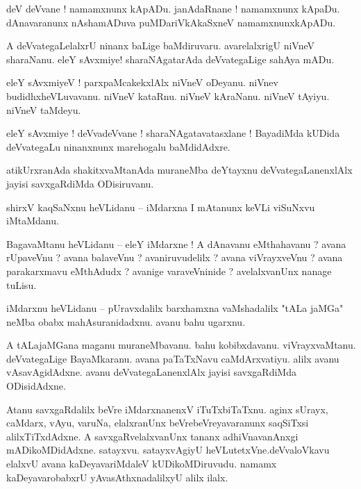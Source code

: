 \documentclass{article}
\begin{document}
\begin{mn}%
deV deVvane ! namamxnunx kApADu. janAdaRnane ! namamxnunx kApaDu. dAnavaranunx nAshamADuva 
puMDariVkAkaSxneV namamxnunxkApADu.
\end{mn}

\begin{mn}%
A deVvategaLelalxrU ninanx baLige baMdiruvaru. avarelalxrigU niVneV sharaNanu. eleY sAvxmiye! 
sharaNAgatarAda deVvategaLige sahAya mADu.
\end{mn}

\begin{mn}%
eleY sAvxmiyeV ! parxpaMcakekxlAlx niVneV oDeyanu. niVnev budidhxheVLuvavanu. niVneV kataRnu. 
niVneV kAraNanu. niVneV tAyiyu. niVneV taMdeyu.
\end{mn}

\begin{mn}%
eleY sAvxmiye ! deVvadeVvane ! sharaNAgatavatasxlane ! BayadiMda kUDida deVvategaLu ninanxnunx 
marehogalu baMdidAdxre.
\end{mn}

\begin{mn}%
atikUrxranAda shakitxvaMtanAda muraneMba deYtayxnu deVvategaLanenxlAlx jayisi savxgaRdiMda 
ODisiruvanu.
\end{mn}

\begin{mn}%
shirxV kaqSaNxnu heVLidanu -- iMdarxna I mAtanunx keVLi viSuNxvu iMtaMdanu.
\end{mn}

\begin{mn}%
BagavaMtanu heVLidanu -- eleY iMdarxne ! A dAnavanu eMthahavanu ? avana rUpaveVnu ? avana balaveVnu 
? avaniruvudelilx ? avana viVrayxveVnu ? avana parakarxmavu eMthAdudx ? avanige varaveVninide ? 
avelalxvanUnx nanage tuLisu.
\end{mn}

\begin{mn}%
iMdarxnu heVLidanu -- pUravxdalilx barxhamxna vaMshadalilx "tALa jaMGa" neMba obabx 
mahAsuranidadxnu. avanu bahu ugarxnu.
\end{mn}

\begin{mn}%
A tALajaMGana maganu muraneMbavanu. bahu kobibxdavanu. viVrayxvaMtanu. deVvategaLige BayaMkaranu. 
avana paTaTxNavu caMdArxvatiyu. alilx avanu vAsavAgidAdxne. avanu deVvategaLanenxlAlx jayisi 
savxgaRdiMda ODisidAdxne.
\end{mn}

\begin{mn}%
Atanu savxgaRdalilx beVre iMdarxnanenxV iTuTxbiTaTxnu. aginx sUrayx, caMdarx, vAyu, varuNa, 
elalxranUnx beVrebeVreyavaranunx saqSiTxsi alilxTiTxdAdxne. A savxgaRvelalxvanUnx tananx 
adhiVnavanAnxgi mADikoMDidAdxne. satayxvu. satayxvAgiyU heVLutetxVne.deVvaloVkavu elalxvU avana 
kaDeyavariMdaleV kUDikoMDiruvudu. namamx kaDeyavarobabxrU yAvasAthxnadalilxyU alilx ilalx.
\end{mn}
\end{document}
